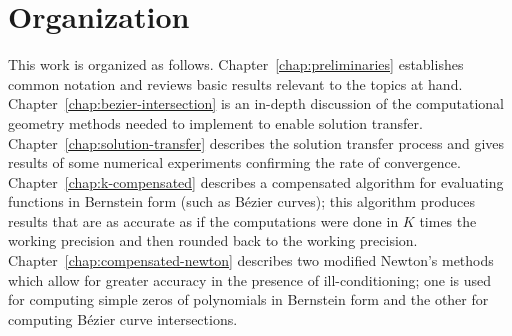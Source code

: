 \section{Organization}

This work is organized as follows. Chapter~\ref{chap:preliminaries}
establishes common notation and reviews basic results relevant to the
topics at hand. Chapter~\ref{chap:bezier-intersection} is an
in-depth discussion of the computational geometry methods needed
to implement to enable solution transfer. Chapter~\ref{chap:solution-transfer}
describes the solution transfer process and gives results of some
numerical experiments confirming the rate of convergence.
Chapter~\ref{chap:k-compensated} describes a compensated algorithm for
evaluating functions in Bernstein form (such as B\'{e}zier curves);
this algorithm produces results that are as accurate as if
the computations were done in \(K\) times the working precision
and then rounded back to the working precision.
Chapter~\ref{chap:compensated-newton} describes two modified Newton's
methods which allow for greater accuracy in the presence of
ill-conditioning; one is used for computing simple zeros
of polynomials in Bernstein form and the other for computing
B\'{e}zier curve intersections.
